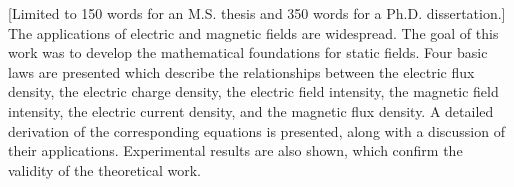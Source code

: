 [Limited to 150 words for an M.S. thesis and 350 words for a Ph.D. dissertation.]
The applications of electric and magnetic fields are widespread.
The goal of this work was to develop the mathematical foundations for static
fields.
Four basic laws are presented which describe the relationships between the
electric flux density, the electric charge density, the electric field
intensity, the magnetic field intensity, the electric current density, and the
magnetic flux density.
A detailed derivation of the corresponding equations is presented, along with a
discussion of their applications.
Experimental results are also shown, which confirm the validity of the
theoretical work.
